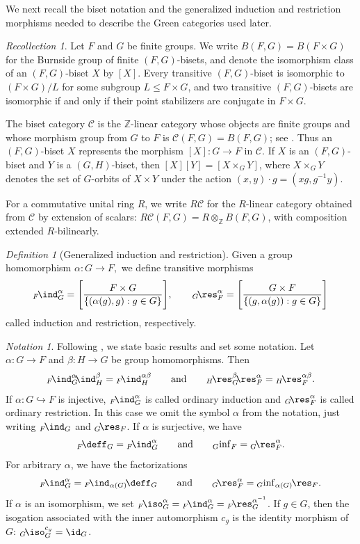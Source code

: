 \documentclass{amsart}
\numberwithin{equation}{section}%
\theoremstyle{remark}
\newtheorem{Def}[equation]{Definition}
\newtheorem{Not}[equation]{Notation}
\newtheorem{Rec}[equation]{Recollection}
\theoremstyle{definition}
\newcommand{\cC}{\mathcal C}
\newcommand{\lind}[1]{{}_{#1}\!\ind}
\newcommand{\lres}[1]{{}_{#1}\!\res}
\newcommand{\ldef}[1]{{}_{#1}\!\deff}
\newcommand{\linf}[1]{{}_{#1}\!\inf}
\newcommand{\liso}[1]{{}_{#1}\!\iso}
\renewcommand{\inf}{\mathop{\mathrm{inf}}\nolimits}
\begin{document}
We next recall the biset notation and the generalized induction and
restriction morphisms needed to describe the Green categories used
later.
%
\begin{Rec}
\label{rec:bisets}
Let $F$ and $G$ be finite groups. We write
$B(F,G)=B(F\times G)$ for the Burnside group of finite $(F,G)$-bisets,
and denote the isomorphism class of an $(F,G)$-biset $X$ by $[X]$.
Every transitive $(F,G)$-biset is isomorphic to
$(F\times G)/L$
for some subgroup $L\leq F\times G$, and two transitive $(F,G)$-bisets
are isomorphic if and only if their point stabilizers are conjugate in
$F\times G$.

The biset category $\cC$ is the $\mathbb Z$-linear category whose objects
are finite groups and whose morphism group from $G$ to $F$ is
$\cC(F,G)=B(F,G)$;
see \cite[Chapters 2, 3]{Bouc10}. Thus an $(F,G)$-biset $X$ represents
the morphism $[X]\colon G\to F$ in $\cC$. If $X$ is an $(F,G)$-biset
and $Y$ is a $(G,H)$-biset, then
$[X][Y]=[X\times_G Y]$,
where $X\times_G Y$ denotes the set of $G$-orbits of $X\times Y$
under the action
$(x,y)\cdot g=(xg,g^{-1}y)$.

For a commutative unital ring $R$, we write $R\cC$ for the
$R$-linear category obtained from $\cC$ by extension of scalars:
$R\cC(F,G)=R\otimes_{\mathbb Z}B(F,G)$,
with composition extended $R$-bilinearly.
\end{Rec}
%
\begin{Def}[Generalized induction and restriction]
	\label{def:generalized-induction-restriction}
Given a group homomorphism $\alpha : G \rightarrow F,$ we define
transitive morphisms 
%
\[\lind{F}_{G}^{\alpha}=
\Bigg[ \frac{F\times G}{\{(\alpha(g),g): g \in G\}}\Bigg]
,\qquad\lres{G}_{F}^{\alpha}= \Bigg[ \frac{G\times F}
{\{(g, \alpha(g)) : g \in G\}}\Bigg]
\]
called induction and restriction, respectively. 
\end{Def}
%
\begin{Not}
\label{not:basic-biset-morphisms}
Following \cite{Barker16a}, we state basic results and set some notation. Let $\alpha :G \rightarrow F$ and
$\beta:H \rightarrow G $ be group homomorphisms. Then
%
\[
\lind{F}_G^\alpha\!\lind{}_H^\beta
=
\lind{F}_H^{\alpha\beta}
\qquad\text{and}\qquad
\lres{H}_G^\beta\!\lres{}_F^\alpha
=
\lres{H}_F^{\alpha\beta}.
\]
%
If $\alpha : G \hookrightarrow F$ is injective, $\lind{F}_G^\alpha$ is called
ordinary induction and $\lres{G}_F^\alpha$ is called ordinary
restriction. In this case 
we omit the symbol $\alpha$ from the notation, just
writing $\lind{F}_G$ and $\lres{G}_F$. If $\alpha$ is surjective, we have
%
\[
\ldef{F}_G
=
\lind{F}_G^\alpha
\qquad\text{and}\qquad
\linf{G}_F
=
\lres{G}_F^\alpha.
\]
%
For arbitrary $\alpha$, we have the factorizations
%
\[
\lind{F}_G^\alpha
=
\lind{F}_{\alpha(G)}\!
\deff_G
\qquad\text{and}\qquad
\lres{G}_F^\alpha
=
\linf{G}_{\alpha(G)}\!
\lres{}_F.
\]
%
If $\alpha$ is an isomorphism, we set
$\liso{F}_G^\alpha
=
\lind{F}_G^\alpha
=
\lres{F}_G^{\alpha^{-1}}$. 
If $g\in G$, then the isogation associated with the inner
automorphism $c_g$ is the identity morphism of $G$:
$\liso{G}_G^{c_g}=\id_G$.
\end{Not}
\end{document}

